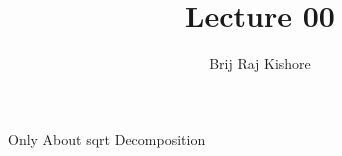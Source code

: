 \documentclass[12pt,twocolumn]{article}
\title{Lecture 00}
\date{}
\author{Brij Raj Kishore}
\begin{document}
	\maketitle
		Only About sqrt Decomposition
\end{document}
